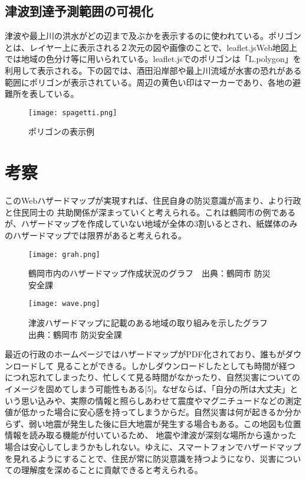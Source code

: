 \documentclass[a4j,twocolumn,dvipdfmx]{jarticle}
\begin{document}
  \subsection{津波到達予測範囲の可視化}
  津波や最上川の洪水がどの辺まで及ぶかを表示するのに使われている。ポリゴンとは、レイヤー上に表示される２次元の図や画像のことで、leaflet.jsWeb地図上では地域の色分け等に用いられている。leaflet.jsでのポリゴンは「L.polygon」を利用して表示される。下の図では、酒田沿岸部や最上川流域が水害の恐れがある範囲にポリゴンが表示されている。周辺の黄色い印はマーカーであり、各地の避難所を表している。
   \begin{center}
   \begin{figure}[htp]
    \texttt{[image: spagetti.png]}
    \caption{ポリゴンの表示例}
   \end{figure}
\end{center}
  \section{考察}
  このWebハザードマップが実現すれば、住民自身の防災意識が高まり、より行政と住民同士の
  共助関係が深まっていくと考えられる。これは鶴岡市の例であるが、ハザードマップを作成していない地域が全体の3割いるとされ、紙媒体のみのハザードマップでは限界があると考えられる。 \begin{center}
    \begin{figure}[htp]
      \centering
     \texttt{[image: grah.png]}
     \caption{鶴岡市内のハザードマップ作成状況のグラフ　出典：鶴岡市 防災安全課}
   \end{figure}
  \end{center}
   \begin{center}
   \begin{figure}[htp]
     \texttt{[image: wave.png]}
     \caption{津波ハザードマップに記載のある地域の取り組みを示したグラフ　出典：鶴岡市 防災安全課}
   \end{figure}
  \end{center}
  最近の行政のホームページではハザードマップがPDF化されており、誰もがダウンロードして
  見ることができる。しかしダウンロードしたとしても時間が経つにつれ忘れてしまったり、忙しくて見る時間がなかったり、自然災害についてのイメージを固めてしまう可能性もある[5]。なぜならば、「自分の所は大丈夫」という思い込みや、実際の情報と照らしあわせて震度やマグニチュードなどの測定値が低かった場合に安心感を持ってしまうからだ。自然災害は何が起きるか分からず、弱い地震が発生した後に巨大地震が発生する場合もある。この地図も位置情報を読み取る機能が付いているため、
  地震や津波が深刻な場所から遠かった場合は安心してしまうかもしれない。ゆえに、スマートフォンでハザードマップを見れるようにすることで、住民が常に防災意識を持つようになり、災害についての理解度を深めることに貢献できると考えられる。
\end{document}

